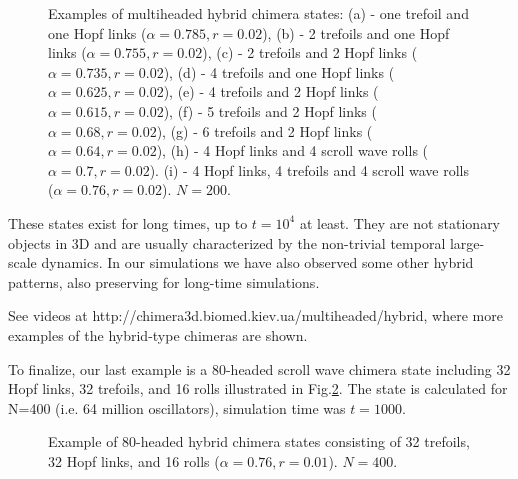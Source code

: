 \documentclass[epjST]{svjour}
\begin{document}
\begin{figure}[ht!]
 \caption{Examples of multiheaded hybrid chimera states: 
(a) -  one trefoil and one Hopf links ($\alpha=0.785, r=0.02$), (b) - 2 trefoils and one Hopf links ($\alpha=0.755, r=0.02$), 
(c) -  2 trefoils and 2 Hopf links ($\alpha=0.735, r=0.02$),
 (d) - 4 trefoils and one Hopf links ($\alpha=0.625, r=0.02$),
(e) - 4 trefoils and 2 Hopf links ($\alpha=0.615, r=0.02$),
 (f) -  5 trefoils and 2 Hopf links ($\alpha=0.68, r=0.02$),
 (g) -  6 trefoils and 2 Hopf links ($\alpha=0.64, r=0.02$),
(h) - 4 Hopf links and 4 scroll wave rolls ($\alpha=0.7, r=0.02$).
(i) - 4 Hopf links, 4 trefoils and 4 scroll wave rolls ($\alpha=0.76, r=0.02$). $N = 200$. } 
  \label{fig:12}
\end{figure}
These states exist for long times, up to $t= 10^{4}$ at least.  They are not stationary objects in 3D and are usually  characterized by the non-trivial  temporal large-scale dynamics. In our simulations we have also observed some other hybrid patterns, also preserving for long-time simulations.

 See videos at http://chimera3d.biomed.kiev.ua/multiheaded/hybrid, 
where more examples of the hybrid-type chimeras are shown. 

To finalize, our last example is a 80-headed scroll wave chimera state including  32 Hopf links, 32 trefoils, and 16 rolls illustrated in
Fig.\ref{fig:13}. The state is calculated for N=400 (i.e. 64 million oscillators), simulation time was $t=1000$.


\begin{figure}[h]
 \caption{Example of 80-headed hybrid chimera states consisting of 32 trefoils, 32  Hopf links, and 16 rolls  ($\alpha=0.76, r=0.01$). $N = 400$. } 
  \label{fig:13}
\end{figure}

\end{document}

